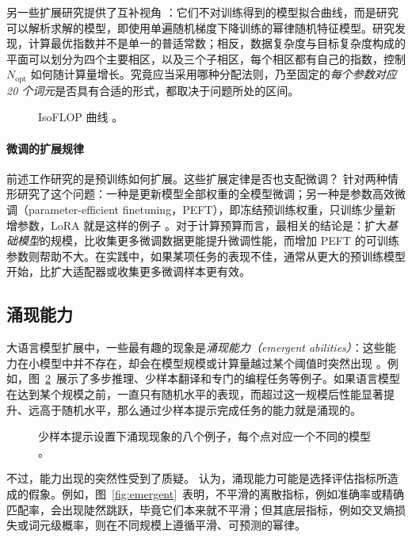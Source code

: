 另一些扩展研究提供了互补视角 \citep{paquette2024}：它们不对训练得到的模型拟合曲线，而是研究可以解析求解的模型，即使用单遍随机梯度下降训练的幂律随机特征模型。研究发现，计算最优指数并不是单一的普适常数；相反，数据复杂度与目标复杂度构成的平面可以划分为四个主要相区，以及三个子相区，每个相区都有自己的指数，控制 $N_{\mbox{opt}}$ 如何随计算量增长。究竟应当采用哪种分配法则，乃至固定的{\em 每个参数对应 20 个词元}是否具有合适的形式，都取决于问题所处的区间。

\begin{figure}
    \centering
    
    \caption{IsoFLOP 曲线 \citep{10.5555/3600270.3602446}。}
    \label{fig:isoflop}
\end{figure}

\paragraph{微调的扩展规律}
前述工作研究的是预训练如何扩展。这些扩展定律是否也支配微调？\citet{zhang2024when} 针对两种情形研究了这个问题：一种是更新模型全部权重的全模型微调；另一种是参数高效微调（parameter-efficient finetuning，PEFT），即冻结预训练权重，只训练少量新增参数，LoRA 就是这样的例子 \citep{hu2021lora}。对于计算预算而言，最相关的结论是：扩大\emph{基础模型}的规模，比收集更多微调数据更能提升微调性能，而增加 PEFT 的可训练参数则帮助不大。在实践中，如果某项任务的表现不佳，通常从更大的预训练模型开始，比扩大适配器或收集更多微调样本更有效。

\subsection{涌现能力}
大语言模型扩展中，一些最有趣的现象是\emph{涌现能力（emergent abilities）}：这些能力在小模型中并不存在，却会在模型规模或计算量越过某个阈值时突然出现 \citep{wei2022emergent}。例如，图~\ref{fig:emergent-abilities}~展示了多步推理、少样本翻译和专门的编程任务等例子。如果语言模型在达到某个规模之前，一直只有随机水平的表现，而超过这一规模后性能显著提升、远高于随机水平，那么通过少样本提示完成任务的能力就是涌现的。

\begin{figure}
    \centering
    
    \caption{少样本提示设置下涌现现象的八个例子，每个点对应一个不同的模型 \citep{wei2022emergent}。}
    \label{fig:emergent-abilities}
\end{figure}

不过，能力出现的突然性受到了质疑。\citet{schaeffer2023emergent} 认为，涌现能力可能是选择评估指标所造成的假象。例如，图~\ref{fig:emergent}~表明，不平滑的离散指标，例如准确率或精确匹配率，会出现陡然跳跃，毕竟它们本来就不平滑；但其底层指标，例如交叉熵损失或词元级概率，则在不同规模上遵循平滑、可预测的幂律。

